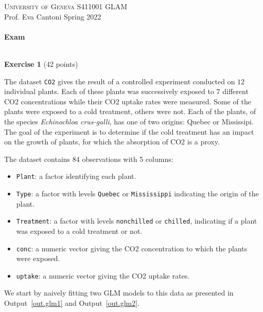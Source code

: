 \documentclass[11pt,a4paper%
addpoints, 
answers%
]{exam}
\begin{document}
\noindent \textsc{University of Geneva} \hfill S411001 GLAM\\
Prof. Eva Cantoni \hfill Spring 2022\\
\noindent
\makebox[\linewidth]{\rule{\textwidth}{0.4pt}}\\[1.5ex]
\hfill \textbf{Exam} \hfill {}\\
\makebox[\linewidth]{\rule{\textwidth}{0.4pt}}\\

\bigskip

\setlength{\parskip}{1ex plus 0.5ex minus 0.2ex}
\parindent=0cm
\linespread{1.1}


{\Large \textbf{Exercise 1} \hfill (42 points)}

\bigskip 

The dataset \texttt{CO2} gives the result of a controlled experiment conducted on $12$ individual plants. 
	Each of these plants was successively exposed to 7 different CO2 concentrations while their CO2 uptake rates were measured. 
	Some of the plants were exposed to a cold treatment, others were not. 
	Each of the plants, of the species \textit{Echinochloa crus-galli}, has one of two origins: Quebec or Mississipi. 
	The goal of the experiment is to determine if the cold treatment has an impact on the growth of plants, for which the absorption of CO2 is a proxy.
	
	The dataset contains 84 observations with 5 columns: 
	\begin{itemize}
		\item \texttt{Plant}: a factor  identifying each plant.
		\item \texttt{Type}: a factor with levels \texttt{Quebec} or \texttt{Mississippi} indicating the origin of the plant.
		\item \texttt{Treatment}: a factor with levels \texttt{nonchilled} or \texttt{chilled}, indicating if a plant was exposed to a cold treatment or not. 
		\item \texttt{conc}: a numeric vector giving the CO2 concentration to which the plants were exposed.
		\item \texttt{uptake}: a numeric vector giving the CO2 uptake rates.		
	\end{itemize}
	
We start by naively fitting two GLM models to this data as presented in Output~\ref{out.glm1} and Output~\ref{out.glm2}.
\end{document}
